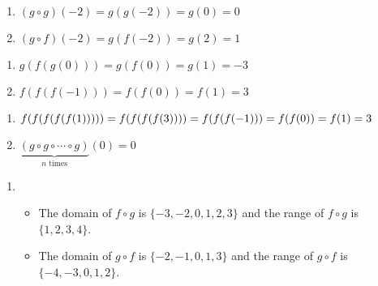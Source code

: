 \documentclass{ximera}
\begin{document}
\begin{multicols}{2}
\begin{enumerate}
\setcounter{enumi}{\value{HW}}

\item $(g \circ g)(-2) = g(g(-2)) = g(0) = 0$
\item $(g \circ f)(-2) = g(f(-2)) = g(2) = 1$

\setcounter{HW}{\value{enumi}}
\end{enumerate}
\end{multicols}

\begin{multicols}{2}
\begin{enumerate}
\setcounter{enumi}{\value{HW}}

\item $g(f(g(0))) = g(f(0)) = g(1) = -3$
\item $f(f(f(-1))) = f(f(0)) = f(1) = 3$

\setcounter{HW}{\value{enumi}}
\end{enumerate}
\end{multicols}

\begin{multicols}{2}
\begin{enumerate}
\setcounter{enumi}{\value{HW}}

\item $f(f(f(f(f(1))))) = f(f(f(f(3)))) =\\ f(f(f(-1))) = f(f(0))  = f(1) = 3$
\item $\underbrace{(g \circ g \circ \cdots \circ g)}_{\mbox{$n$ times}}(0) = 0$

\setcounter{HW}{\value{enumi}}
\end{enumerate}
\end{multicols}

\begin{enumerate}
\setcounter{enumi}{\value{HW}}

\item  \begin{itemize}  \item  The domain of $f \circ g$ is $\{ -3, -2, 0, 1, 2, 3\}$ and the range of $f \circ g$ is $\{1, 2, 3, 4\}$.
\item The domain of $g \circ f$ is $\{ -2, -1, 0, 1, 3 \}$ and the range of $g \circ f$ is $\{ -4, -3, 0, 1, 2 \}$.

\end{itemize}

\setcounter{HW}{\value{enumi}}
\end{enumerate}
\end{document}
